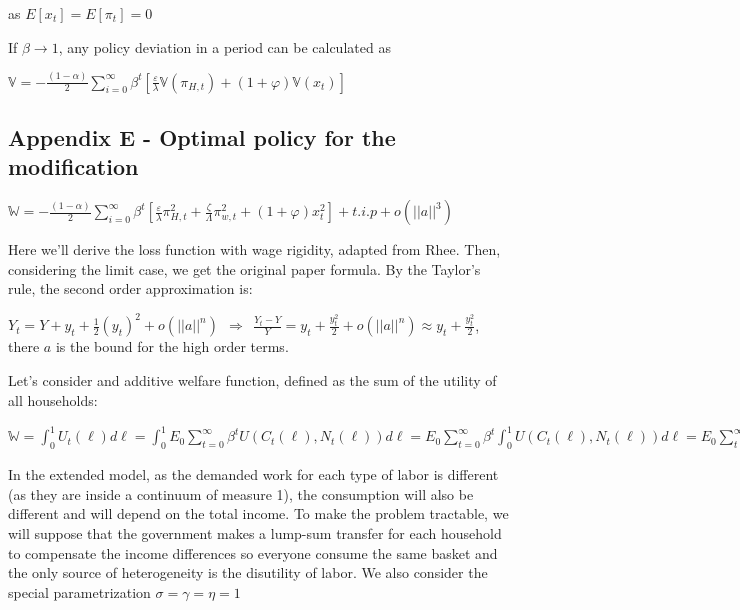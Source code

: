 \documentclass[
]{article}
\begin{document}
as \(E[x_t]=E[\pi_t]=0\)

If \(\beta \to 1\), any policy deviation in a period can be calculated
as

\(\displaystyle \mathbb{V} = -\frac{(1-\alpha)}{2}\sum_{i=0}^{\infty} \beta^t \left[ \frac{\varepsilon}{\lambda}\mathbb{V}(\pi_{H,t})+ (1+\varphi)\mathbb{V}(x_t) \right]\)

\hypertarget{appendix-e---optimal-policy-for-the-modification}{%
\subsection{Appendix E - Optimal policy for the
modification}\label{appendix-e---optimal-policy-for-the-modification}}

\(\displaystyle \mathbb{W}= -\frac{(1-\alpha)}{2}\sum_{i=0}^{\infty} \beta^t \left[ \frac{\varepsilon}{\lambda}\pi_{H,t}^2+\frac{\zeta}{\Lambda}\pi_{w,t}^2+ (1+\varphi)x_t^2 \right] + t.i.p+ o(||a||^3)\)

\vspace{8pt}

Here we'll derive the loss function with wage rigidity, adapted from
Rhee. Then, considering the limit case, we get the original paper
formula. By the Taylor's rule, the second order approximation is:

\(\displaystyle Y_t = Y+y_t+\frac{1}{2} \left( y_t \right)^2+o(||a||^n) \ \ \Rightarrow \ \ \displaystyle \frac{Y_t-Y}{Y}= y_t+\frac{y_t^2}{2} +o(||a||^n) \approx y_t+\frac{y_t^2}{2}\),
there \(a\) is the bound for the high order terms.

Let's consider and additive welfare function, defined as the sum of the
utility of all households:

\(\displaystyle \mathbb{W}=\int_0^1 U_t(\ell)d\ell = \int_0^1 E_0\sum_{t=0}^\infty \beta^t U(C_t(\ell),N_t(\ell))d\ell = E_0 \sum_{t=0}^{\infty} \beta^t \int_0^1 U(C_t(\ell),N_t(\ell))d\ell=E_0 \sum_{t=0}^{\infty} \beta^t \int_0^1 \left(\log C_t(\ell)-\frac{N_t(\ell)}{1+\varphi}\right)d\ell\)

In the extended model, as the demanded work for each type of labor is
different (as they are inside a continuum of measure 1), the consumption
will also be different and will depend on the total income. To make the
problem tractable, we will suppose that the government makes a lump-sum
transfer for each household to compensate the income differences so
everyone consume the same basket and the only source of heterogeneity is
the disutility of labor. We also consider the special parametrization
\(\sigma=\gamma=\eta=1\)
\end{document}
